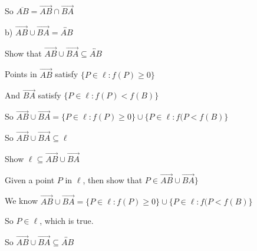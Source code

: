 \documentclass[11pt]{article}
\begin{document}
\begin{itemize}
		So $\overline{AB} = \overrightarrow{AB} \cap \overrightarrow{BA}$

		b) $\overrightarrow{AB} \cup \overrightarrow{BA} = \overleftrightarrow{AB}$

		Show that $\overrightarrow{AB} \cup \overrightarrow{BA} \subseteq \overleftrightarrow{AB}$

		Points in $\overrightarrow{AB}$ satisfy $\{P\in\ell : f(P) \geq 0\}$

		And $\overrightarrow{BA}$ satisfy $\{P\in\ell : f(P) < f(B)\}$

		So $\overrightarrow{AB} \cup \overrightarrow{BA} = \{P\in\ell : f(P) \geq 0\} \cup \{P\in\ell : f(P < f(B)\}$

		So $\overrightarrow{AB} \cup \overrightarrow{BA} \subseteq \ell$

		Show $\ell \subseteq \overrightarrow{AB} \cup \overrightarrow{BA}$

		Given a point $P$ in $\ell$, then show that $P \in \overrightarrow{AB} \cup \overrightarrow{BA}\}$

		We know $\overrightarrow{AB} \cup \overrightarrow{BA} = \{P\in\ell : f(P) \geq 0\} \cup \{P\in\ell : f(P < f(B)\}$

		So $P \in \ell$, which is true.

		So $\overrightarrow{AB} \cup \overrightarrow{BA} \subseteq \overleftrightarrow{AB}$
\end{itemize}
\end{document}
